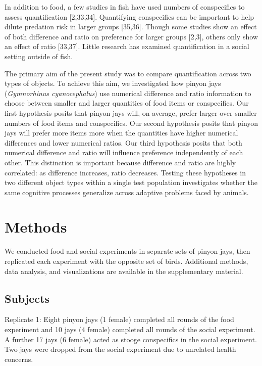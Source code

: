 \documentclass[
  ,doc,floatsintext]{apa6}
\begin{document}
In addition to food, a few studies in fish have used numbers of conspecifics to assess quantification {[}2,33,34{]}. Quantifying conspecifics can be important to help dilute predation risk in larger groups {[}35,36{]}. Though some studies show an effect of both difference and ratio on preference for larger groups {[}2,3{]}, others only show an effect of ratio {[}33,37{]}. Little research has examined quantification in a social setting outside of fish.

The primary aim of the present study was to compare quantification across two types of objects. To achieve this aim, we investigated how pinyon jays (\emph{Gymnorhinus cyanocephalus}) use numerical difference and ratio information to choose between smaller and larger quantities of food items or conspecifics. Our first hypothesis posits that pinyon jays will, on average, prefer larger over smaller numbers of food items and conspecifics. Our second hypothesis posits that pinyon jays will prefer more items more when the quantities have higher numerical differences and lower numerical ratios. Our third hypothesis posits that both numerical difference and ratio will influence preference independently of each other. This distinction is important because difference and ratio are highly correlated: as difference increases, ratio decreases. Testing these hypotheses in two different object types within a single test population investigates whether the same cognitive processes generalize across adaptive problems faced by animals.

\hypertarget{methods}{%
\section{Methods}\label{methods}}

We conducted food and social experiments in separate sets of pinyon jays, then replicated each experiment with the opposite set of birds. Additional methods, data analysis, and visualizations are available in the supplementary material.

\hypertarget{subjects}{%
\subsection{Subjects}\label{subjects}}

Replicate 1: Eight pinyon jays (1 female) completed all rounds of the food experiment and 10 jays (4 female) completed all rounds of the social experiment. A further 17 jays (6 female) acted as stooge conspecifics in the social experiment. Two jays were dropped from the social experiment due to unrelated health concerns.
\end{document}
